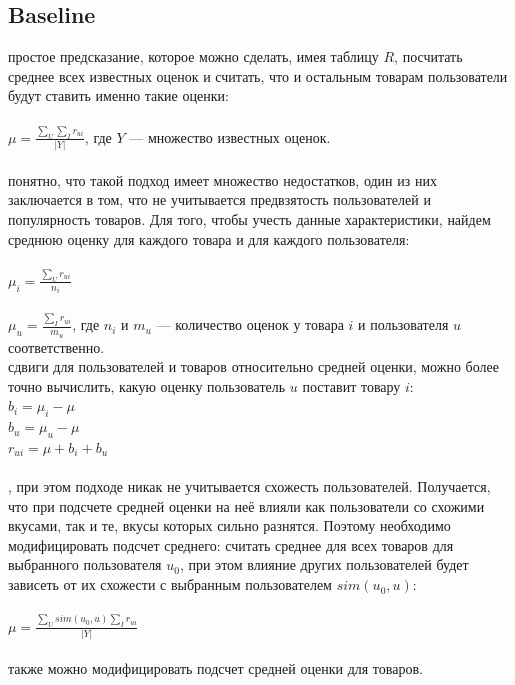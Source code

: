 \documentclass{article}
\newcommand\tab[1][1cm]{\hspace*{#1}}
\begin{document}
\subsection{Baseline}
 простое предсказание, которое можно сделать, имея таблицу ﻿$R$﻿, посчитать среднее всех известных оценок и считать, что и остальным товарам пользователи будут ставить именно такие оценки:\\
\\
\tab$\mu=\frac{\sum_U{\sum_I{r_{ui}}}}{|Y|}$, где $Y$ — множество известных оценок.\\ 
\\
 понятно, что такой подход имеет множество недостатков, один из них заключается в том, что не учитывается предвзятость пользователей и популярность товаров. Для того, чтобы учесть данные характеристики, найдем среднюю оценку для каждого товара и для каждого пользователя:\\
\\
\tab$\mu_i=\frac{\sum_U{r_{ui}}}{n_i}$\\
\\
\tab$\mu_u=\frac{\sum_I{r_{ui}}}{m_u}$, где ${n_i}$ и ${m_u}$ — количество оценок у товара $i$﻿ и пользователя ﻿$u$ соответственно.\\
 сдвиги для пользователей и товаров относительно средней оценки, можно более точно вычислить, какую оценку пользователь ﻿$u$﻿ поставит товару $i$﻿﻿:\\
\tab$b_i=\mu_i-\mu$\\
\tab$b_u=\mu_u-\mu$\\
\tab$r_{ui}=\mu+b_i+b_u$\\
\\
, при этом подходе никак не учитывается схожесть пользователей. Получается, что при подсчете средней оценки на неё влияли как пользователи со схожими вкусами, так и те, вкусы которых сильно разнятся. Поэтому необходимо модифицировать подсчет среднего: считать среднее для всех товаров для выбранного пользователя ﻿$u_0$, при этом влияние других пользователей будет зависеть от их схожести с выбранным пользователем $sim(u_0,u)$:\\
\\
\tab$\mu=\frac{\sum_U{sim(u_0,u)}\sum_I{r_{ui}}}{|Y|}$\\
\\
 также можно модифицировать подсчет средней оценки для товаров.
\end{document}
